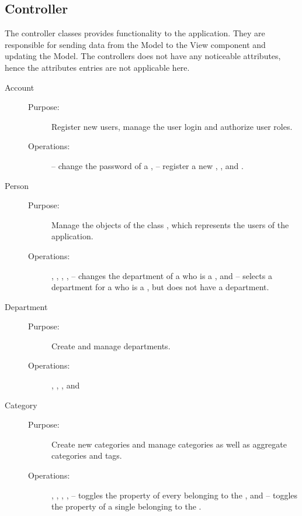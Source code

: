 \subsection{Controller}
The controller classes provides functionality to the application.
They are responsible for sending data from the Model to the View component and updating the Model.
The controllers does not have any noticeable attributes, hence the attributes entries are not applicable here.

\begin{description}
\item[Account]\hfill
\begin{description}
\item[Purpose:]Register new users, manage the user login and authorize user roles.
\item[Operations:] -- change the password of a ,  -- register a new , , and .
\end{description}
\end{description}

\begin{description}
\item[Person]\hfill
\begin{description}
\item[Purpose:]Manage the objects of the class , which represents the users of the application.
\item[Operations:], , , ,  -- changes the department of a  who is a \astaff[], and  -- selects a department for a  who is a \astaff[], but does not have a department.
\end{description}
\end{description}

\begin{description}
\item[Department]\hfill
\begin{description}
\item[Purpose:]Create and manage departments.
\item[Operations:], , , and 
\end{description}
\end{description}

\begin{description}
\item[Category]\hfill
\begin{description}
\item[Purpose:]Create new categories and manage categories as well as aggregate categories and tags.
\item[Operations:], , , ,  -- toggles the  property of every  belonging to the , and  -- toggles the  property of a single  belonging to the .
\end{description}
\end{description}

